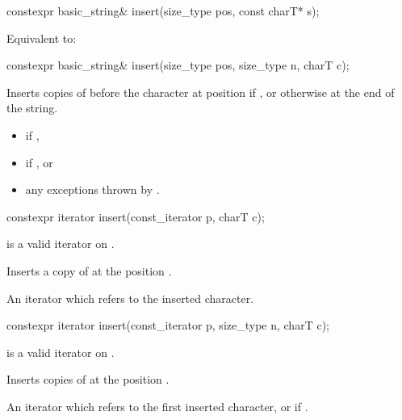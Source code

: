 %
\begin{itemdecl}
constexpr basic_string& insert(size_type pos, const charT* s);
\end{itemdecl}

\begin{itemdescr}
\pnum
\effects
Equivalent to: 
\end{itemdescr}

%
\begin{itemdecl}
constexpr basic_string& insert(size_type pos, size_type n, charT c);
\end{itemdecl}

\begin{itemdescr}
\pnum
\effects
Inserts  copies of  before the character at position 
if ,
or otherwise at the end of the string.

\pnum
\returns
{}

\pnum
\throws
\begin{itemize}
\item {} if ,
\item {} if , or
\item any exceptions thrown by .
\end{itemize}
\end{itemdescr}

%
\begin{itemdecl}
constexpr iterator insert(const_iterator p, charT c);
\end{itemdecl}

\begin{itemdescr}
\pnum
\expects
{} is a valid iterator on
.

\pnum
\effects
Inserts a copy of  at the position .

\pnum
\returns
An iterator which refers to the inserted character.
\end{itemdescr}

%
\begin{itemdecl}
constexpr iterator insert(const_iterator p, size_type n, charT c);
\end{itemdecl}

\begin{itemdescr}
\pnum
\expects
{} is a valid iterator on
.

\pnum
\effects
Inserts  copies of  at the position .

\pnum
\returns
An iterator which refers to  the first inserted character, or
 if .
\end{itemdescr}

